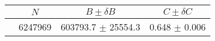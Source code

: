 \begin{tabular}{lccc}
\hline
    &   $N$   & $B \pm \delta B$  &  $C \pm \delta C$ \\
\hline
                               & 6247969    & 603793.7   $\pm$ 25554.3 & 0.648      $\pm$ 0.006 \\
\hline
\end{tabular}
